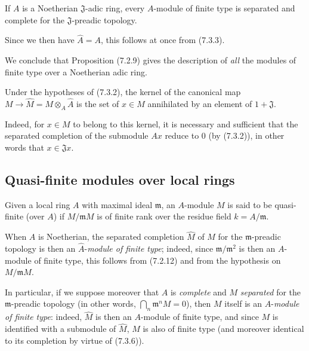 \begin{corollary}[7.3.6]
\label{0.7.3.6}
If $A$ is a Noetherian $\mathfrak J$-adic ring, every $A$-module of finite
type is separated and complete for the $\mathfrak J$-preadic topology.
\end{corollary}

Since we then have $\widehat A=A$, this follows at once from (7.3.3).

We conclude that Proposition (7.2.9) gives the description of \emph{all} the
modules of finite type over a Noetherian adic ring.

\begin{corollary}[7.3.7]
\label{0.7.3.7}
Under the hypotheses of (7.3.2), the kernel of the canonical map
$M\to\widehat M=M\otimes_A\widehat A$ is the set of $x\in M$ annihilated by
an element of $1+\mathfrak J$.
\end{corollary}

Indeed, for $x\in M$ to belong to this kernel, it is necessary and sufficient that
the separated completion of the submodule $Ax$ reduce to 0 (by (7.3.2)), in other
words that $x\in\mathfrak Jx$.

\subsection{Quasi-finite modules over local rings}
\label{subsection:0.7.4}

\begin{definition}[7.4.1]
\label{0.7.4.1}
Given a local ring $A$ with maximal ideal $\mathfrak m$, an
$A$-module $M$ is said to be quasi-finite (over $A$) if $M/\mathfrak mM$ is of finite rank
over the residue field $k=A/\mathfrak m$.
\end{definition}

When $A$ is Noetherian, the separated completion $\widehat M$ of $M$ for the
$\mathfrak m$-preadic topology is then an
$\widehat A$-\emph{module of finite type}; indeed, since
$\mathfrak m/\mathfrak m^2$ is then an $A$-module of finite type, this follows
from (7.2.12) and from the hypothesis on $M/\mathfrak mM$.

In particular, if we suppose moreover that $A$ is \emph{complete} and $M$
\emph{separated} for the $\mathfrak m$-preadic topology (in other words,
$\bigcap_n\mathfrak m^nM=0$), then $M$ itself is an
$A$-\emph{module of finite type}: indeed, $\widehat M$ is then an
$A$-module of finite type, and since $M$ is identified with a submodule of
$\widehat M$, $M$ is also of finite type (and moreover identical to its
completion by virtue of (7.3.6)).

